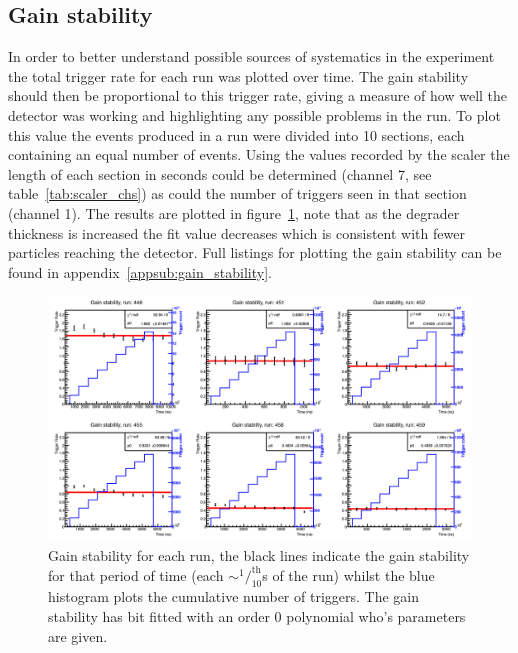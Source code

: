 \subsection{Gain stability} %
\label{sub:gain_stability}
In order to better understand possible sources of systematics in the experiment the total trigger rate for each run was plotted over time. The gain stability should then be proportional to this trigger rate, giving a measure of how well the detector was working and highlighting any possible problems in the run. To plot this value the events produced in a run were divided into 10 sections, each containing an equal number of events. Using the values recorded by the scaler the length of each section in seconds could be determined (channel 7, see table~\ref{tab:scaler_chs}) as could the number of triggers seen in that section (channel 1). The results are plotted in figure~\ref{fig:gain_stability}, note that as the degrader thickness is increased the fit value decreases which is consistent with fewer particles reaching the detector. Full listings for plotting the gain stability can be found in appendix~\ref{appsub:gain_stability}.
%
\begin{figure}[htbp]
    \centering
        \includegraphics[width=\textwidth]{images/gain_stability.png}
    \caption{Gain stability for each run, the black lines indicate the gain stability for that period of time (each $\sim^1/_{10}^{\text{th}}$s of the run) whilst the blue histogram plots the cumulative number of triggers. The gain stability has bit fitted with an order 0 polynomial who's parameters are given.}
    \label{fig:gain_stability}
\end{figure}
%
